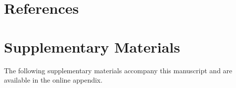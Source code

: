 \documentclass[12pt]{article}
\begin{document}
\clearpage
\section*{References}

\renewcommand{\refname}{}





\clearpage
\section*{Supplementary Materials}

The following supplementary materials accompany this manuscript and are available in the online appendix.
\end{document}
